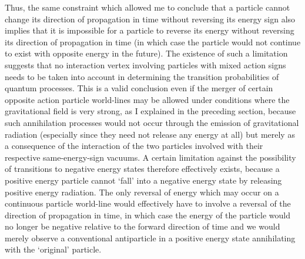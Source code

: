 \documentclass[notitlepage,12pt]{report}
\begin{document}
Thus, the same constraint which allowed me to conclude that a particle cannot change its direction of propagation in time without reversing its energy sign also implies that it is impossible for a particle to reverse its energy without reversing its direction of propagation in time (in which case the particle would not continue to exist with opposite energy in the future). The existence of such a limitation suggests that no interaction vertex involving particles with mixed action signs needs to be taken into account in determining the transition probabilities of quantum processes. This is a valid conclusion even if the merger of certain opposite action particle world-lines may be allowed under conditions where the gravitational field is very strong, as I explained in the preceding section, because such annihilation processes would not occur through the emission of gravitational radiation (especially since they need not release any energy at all) but merely as a consequence of the interaction of the two particles involved with their respective same-energy-sign vacuums. A certain limitation against the possibility of transitions to negative energy states therefore effectively exists, because a positive energy particle cannot `fall' into a negative energy state by releasing positive energy radiation. The only reversal of energy which may occur on a continuous particle world-line would effectively have to involve a reversal of the direction of propagation in time, in which case the energy of the particle would no longer be negative relative to the forward direction of time and we would merely observe a conventional antiparticle in a positive energy state annihilating with the `original' particle.
\end{document}
